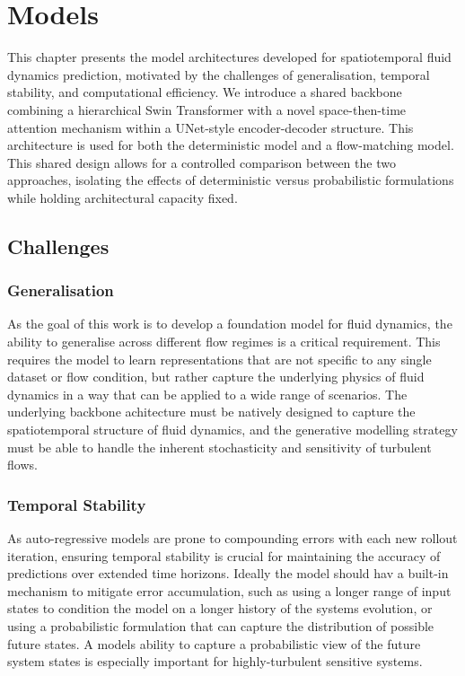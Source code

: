 \chapter{Models}\label{ch:models}

This chapter presents the model architectures developed for spatiotemporal fluid dynamics prediction, motivated by the challenges of generalisation, temporal stability, and computational efficiency. We introduce a shared backbone combining a hierarchical Swin Transformer with a novel space-then-time attention mechanism within a UNet-style encoder-decoder structure. This architecture is used for both the deterministic model and a flow-matching model. This shared design allows for a controlled comparison between the two approaches, isolating the effects of deterministic versus probabilistic formulations while holding architectural capacity fixed.

\section{Challenges}

\subsection{Generalisation}

As the goal of this work is to develop a foundation model for fluid dynamics, the ability to generalise across different flow regimes is a critical requirement. This requires the model to learn representations that are not specific to any single dataset or flow condition, but rather capture the underlying physics of fluid dynamics in a way that can be applied to a wide range of scenarios. The underlying backbone achitecture must be natively designed to capture the spatiotemporal structure of fluid dynamics, and the generative modelling strategy must be able to handle the inherent stochasticity and sensitivity of turbulent flows.

\subsection{Temporal Stability}

As auto-regressive models are prone to compounding errors with each new rollout iteration, ensuring temporal stability is crucial for maintaining the accuracy of predictions over extended time horizons. Ideally the model should hav a built-in mechanism to mitigate error accumulation, such as using a longer range of input states to condition the model on a longer history of the systems evolution, or using a probabilistic formulation that can capture the distribution of possible future states. A models ability to capture a probabilistic view of the future system states is especially important for highly-turbulent sensitive systems.

